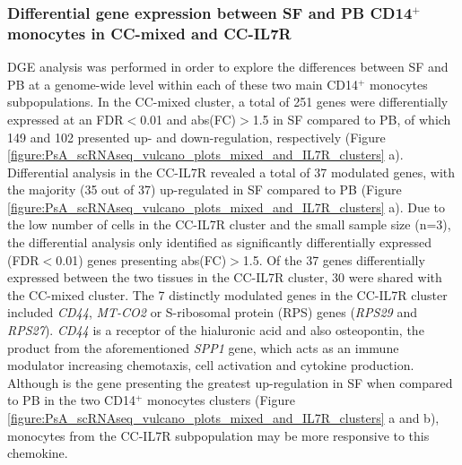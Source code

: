 \subsubsection{Differential gene expression between SF and PB CD14$^+$ monocytes in CC-mixed and CC-IL7R}
DGE analysis was performed in order to explore the differences between SF and PB at a genome-wide level within each of these two main CD14$^+$ monocytes subpopulations. In the CC-mixed cluster, a total of 251 genes were differentially expressed at an FDR$<$0.01 and abs(FC)$>$1.5 in SF compared to PB, of which 149 and 102 presented up- and down-regulation, respectively (Figure \ref{figure:PsA_scRNAseq_vulcano_plots_mixed_and_IL7R_clusters} a). Differential analysis in the CC-IL7R revealed a total of 37 modulated genes, with the majority (35 out of 37) up-regulated in SF compared to PB (Figure \ref{figure:PsA_scRNAseq_vulcano_plots_mixed_and_IL7R_clusters} a). Due to the low number of cells in the CC-IL7R cluster and the small sample size (n=3), the differential analysis only identified as significantly differentially expressed (FDR$<$0.01) genes presenting abs(FC)$>$1.5. Of the 37 genes differentially expressed between the two tissues in the CC-IL7R cluster, 30 were shared with the CC-mixed cluster. The 7 distinctly modulated genes in the CC-IL7R cluster included \textit{CD44}, \textit{MT-CO2} or S-ribosomal protein (RPS) genes (\textit{RPS29} and \textit{RPS27}). \textit{CD44} is a receptor of the hialuronic acid and also osteopontin, the product from the aforementioned \textit{SPP1} gene, which acts as an immune modulator increasing chemotaxis, cell activation and cytokine production. Although  is the gene presenting the greatest up-regulation in SF when compared to PB in the two CD14$^+$ monocytes clusters (Figure \ref{figure:PsA_scRNAseq_vulcano_plots_mixed_and_IL7R_clusters} a and b), monocytes from the CC-IL7R subpopulation may be more responsive to this chemokine.


